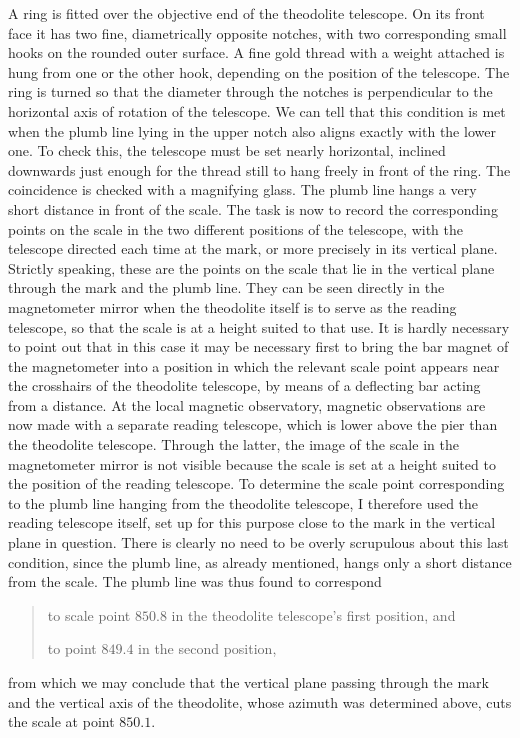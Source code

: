 A ring is fitted over the objective end of the theodolite telescope. On its front face it has two fine, diametrically opposite notches, with two corresponding small hooks on the rounded outer surface. A fine gold thread with a weight attached is hung from one or the other hook, depending on the position of the telescope. The ring is turned so that the diameter through the notches is perpendicular to the horizontal axis of rotation of the telescope. We can tell that this condition is met when the plumb line lying in the upper notch also aligns exactly with the lower one. To check this, the telescope must be set nearly horizontal, inclined downwards just enough for the thread still to hang freely in front of the ring. The coincidence is checked with a magnifying glass. The plumb line hangs a very short distance in front of the scale. The task is now to record the corresponding points on the scale in the two different positions of the telescope, with the telescope directed each time at the mark, or more precisely in its vertical plane. Strictly speaking, these are the points on the scale that lie in the vertical plane through the mark and the plumb line. They can be seen directly in the magnetometer mirror when the theodolite itself is to serve as the reading telescope, so that the scale is at a height suited to that use. It is hardly necessary to point out that in this case it may be necessary first to bring the bar magnet
of the magnetometer into a position in which the relevant scale point appears near the crosshairs of the theodolite telescope, by means of a deflecting bar acting from a distance. At the local magnetic observatory, magnetic observations are now made with a separate reading telescope, which is lower above the pier than the theodolite telescope. Through the latter, the image of the scale in the magnetometer mirror is not visible because the scale is set at a height suited to the position of the reading telescope. To determine the scale point corresponding to the plumb line hanging from the theodolite telescope, I therefore used the reading telescope itself, set up for this purpose close to the mark in the vertical plane in question. There is clearly no need to be overly scrupulous about this last condition, since the plumb line, as already mentioned, hangs only a short distance from the scale. The plumb line was thus found to correspond
\begin{quote}
to scale point $850.8$ in the theodolite telescope’s first position, and

 to point $849.4$ in the second position,
\end{quote}
from which we may conclude that the vertical plane passing through the mark and the vertical axis of the theodolite, whose azimuth was determined above, cuts the scale at point $850.1$.

